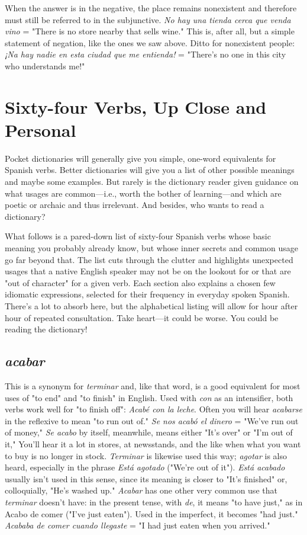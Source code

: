 \documentclass[14pt,a4paper,oneside]{memoir}
\begin{document}
When the answer is in the negative, the place remains nonexistent and therefore must still be referred to in the subjunctive. \emph{No hay
una tienda cerca que venda vino} = "There is no store nearby that
sells wine." This is, after all, but a simple statement of negation, like
the ones we saw above. Ditto for nonexistent people: \emph{¡Na hay nadie en
esta ciudad que me entienda!} = "There's no one in this city who understands me!"

\chapter{Sixty-four Verbs, Up Close and Personal}

Pocket dictionaries will generally give you simple, one-word
equivalents for Spanish verbs. Better dictionaries will give you a list of
other possible meanings and maybe some examples. But rarely is the
dictionary reader given guidance on what usages are common---i.e.,
worth the bother of learning---and which are poetic or archaic and thus
irrelevant. And besides, who wants to read a dictionary?

What follows is a pared-down list of sixty-four Spanish verbs
whose basic meaning you probably already know, but whose inner secrets and common usage go far beyond that. The list cuts through the
clutter and highlights unexpected usages that a native English speaker
may not be on the lookout for or that are "out of character" for a given
verb. Each section also explains a chosen few idiomatic expressions,
selected for their frequency in everyday spoken Spanish. There's a lot
to absorb here, but the alphabetical listing will allow for hour after
hour of repeated consultation. Take heart---it could be worse. You
could be reading the dictionary!

\section{\emph{acabar}}

This is a synonym for \emph{terminar} and, like that word, is a good
equivalent for most uses of "to end" and "to finish" in English. Used
with \emph{con} as an intensifier, both verbs work well for "to finish off":
\emph{Acabé con la leche}. Often you will hear \emph{acabarse} in the reflexive to
mean "to run out of." \emph{Se nos acabó el dinero} = "We've run out of
money," \emph{Se acabo} by itself, meanwhile, means either "It's over" or
"I'm out of it," You'll hear it a lot in stores, at newsstands, and the like
when what you want to buy is no longer in stock. \emph{Terminar} is likewise
used this way; \emph{agotar} is also heard, especially in the phrase \emph{Está agotado} ("We're out of it"). \emph{Está acabado} usually isn't used in this sense,
since its meaning is closer to "It's finished" or, colloquially, "He's
washed up." \emph{Acabar} has one other very common use that \emph{terminar}
doesn't have: in the present tense, with \emph{de}, it means "to have just,"
as in Acabo de comer ("I've just eaten"). Used in the imperfect, it becomes "had just." \emph{Acababa de comer cuando llegaste} = "I had just
eaten when you arrived."
\end{document}
